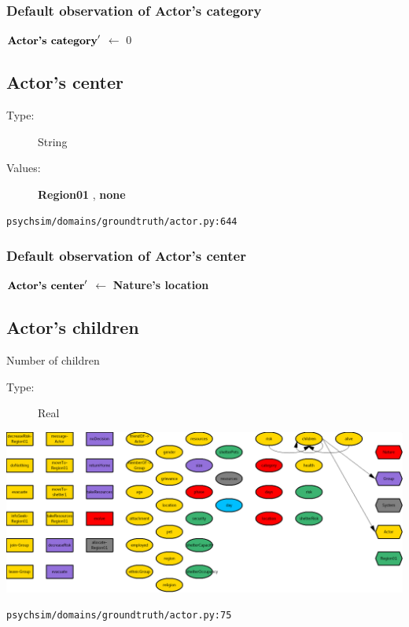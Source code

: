 \documentclass{article}%
\begin{document}
%
\subsubsection{Default observation of Actor's category}%
\label{ssubsec:Default observation of Actor's category}%
\begin{flushleft}%
$\mbox{\textbf{Actor's category}} '$%
$\leftarrow$%
0%
\end{flushleft}

%
\subsection{Actor's center}%
\label{subsec:Actor's center}%
\begin{description}%
\item[Type:]%
String%
\item[Values:]%
\textbf{Region01}%
, %
\textbf{none}%
\end{description}%
\begin{flushleft}%
\verb|psychsim/domains/groundtruth/actor.py:644|%
\end{flushleft}%
\subsubsection{Default observation of Actor's center}%
\label{ssubsec:Default observation of Actor's center}%
\begin{flushleft}%
$\mbox{\textbf{Actor's center}} '$%
$\leftarrow$%
\textbf{Nature's location}%
\end{flushleft}

%
\subsection{Actor's children}%
\label{subsec:Actor's children}%
Number of children%
\begin{description}%
\item[Type:]%
Real%
\end{description}%
\includegraphics[width=\textwidth]{images/childrenOfActor.png}%
\begin{flushleft}%
\verb|psychsim/domains/groundtruth/actor.py:75|%
\end{flushleft}
\end{document}
